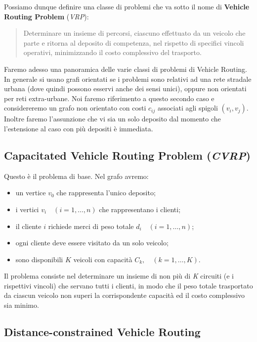 \documentclass[11pt]{book}
\begin{document}
Possiamo dunque definire una classe di problemi che va sotto il nome
di {\bf Vehicle Routing Problem} ({\em VRP}):

\begin{quote}
Determinare un insieme di percorsi, ciascuno effettuato da un veicolo
che parte e ritorna al deposito di competenza, nel rispetto di
specifici vincoli operativi, minimizzando il costo complessivo del
trasporto.
\end{quote}

Faremo adesso una panoramica delle varie classi di problemi di Vehicle
Routing. In generale si usano grafi orientati se i problemi sono
relativi ad una rete stradale urbana (dove quindi possono esservi
anche dei sensi unici), oppure non orientati per reti
extra-urbane. Noi faremo riferimento a questo secondo caso e
considereremo un grafo non orientato con costi $c_{ij}$ associati agli
spigoli $(v_i,v_j)$. Inoltre faremo l'assunzione che vi sia un solo
deposito dal momento che l'estensione al caso con pi\`u depositi \`e
immediata.

\subsection{Capacitated Vehicle Routing Problem ({\em CVRP})}

Questo \`e il problema di base. Nel grafo avremo:

\begin{itemize}
\item un vertice $v_0$ che rappresenta l'unico deposito;
\item i vertici $v_i\quad(i=1,\dots,n)$ che rappresentano i clienti;
\item il cliente $i$ richiede merci di peso totale
  $d_i\quad(i=1,\dots,n)$;
\item ogni cliente deve essere visitato da un solo veicolo;
\item sono disponibili $K$ veicoli con capacit\`a $C_k,\quad
  (k=1,\dots,K)$.
\end{itemize}

Il problema consiste nel determinare un insieme di non pi\`u di {\em
  K} circuiti (e i rispettivi vincoli) che servano tutti i clienti, in
modo che il peso totale trasportato da ciascun veicolo non superi la
corrispondente capacit\`a ed il costo complessivo sia minimo.

\subsection{Distance-constrained Vehicle Routing}
\end{document}

